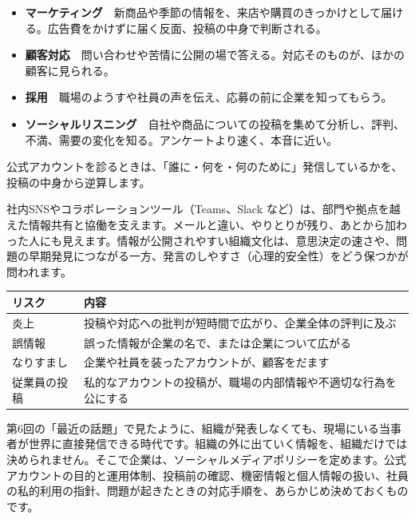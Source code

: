 \documentclass[paper=a4paper,fontsize=10pt,line_length=170mm,number_of_lines=46,baselineskip=1.6zw]{jlreq}
\newcommand\subhead[1]{\par\vspace{2.6mm}{\sffamily\bfseries\large #1}\par\vspace{1.3mm}}
\begin{document}
\begin{itemize}[leftmargin=1.5em,itemsep=0.6mm,topsep=0.3mm]
\item {\sffamily\bfseries マーケティング}　新商品や季節の情報を、来店や購買のきっかけとして届ける。広告費をかけずに届く反面、投稿の中身で判断される。
\item {\sffamily\bfseries 顧客対応}　問い合わせや苦情に公開の場で答える。対応そのものが、ほかの顧客に見られる。
\item {\sffamily\bfseries 採用}　職場のようすや社員の声を伝え、応募の前に企業を知ってもらう。
\item {\sffamily\bfseries ソーシャルリスニング}　自社や商品についての投稿を集めて分析し、評判、不満、需要の変化を知る。アンケートより速く、本音に近い。
\end{itemize}\vspace{0.8mm}
公式アカウントを診るときは、「誰に・何を・何のために」発信しているかを、投稿の中身から逆算します。\par\vspace{1.2mm}
\subhead{組織の中での活用}
社内SNSやコラボレーションツール（Teams、Slack など）は、部門や拠点を越えた情報共有と協働を支えます。メールと違い、やりとりが残り、あとから加わった人にも見えます。情報が公開されやすい組織文化は、意思決定の速さや、問題の早期発見につながる一方、発言のしやすさ（心理的安全性）をどう保つかが問われます。\par\vspace{1.2mm}
\subhead{リスクとガバナンス}
\begin{center}\small\renewcommand{\arraystretch}{1.15}\setlength{\tabcolsep}{1.5mm}
\begin{tabular}{|p{38.0mm}|p{125.0mm}|}\arrayrulecolor{rulec}\hline
\rowcolor{papertwo}\sffamily\bfseries リスク & \sffamily\bfseries 内容\\\hline
炎上 & 投稿や対応への批判が短時間で広がり、企業全体の評判に及ぶ\\\hline
誤情報 & 誤った情報が企業の名で、または企業について広がる\\\hline
なりすまし & 企業や社員を装ったアカウントが、顧客をだます\\\hline
従業員の投稿 & 私的なアカウントの投稿が、職場の内部情報や不適切な行為を公にする\\\hline
\end{tabular}\end{center}\vspace{0.5mm}
第6回の「最近の話題」で見たように、組織が発表しなくても、現場にいる当事者が世界に直接発信できる時代です。組織の外に出ていく情報を、組織だけでは決められません。そこで企業は、ソーシャルメディアポリシーを定めます。公式アカウントの目的と運用体制、投稿前の確認、機密情報と個人情報の扱い、社員の私的利用の指針、問題が起きたときの対応手順を、あらかじめ決めておくものです。\par\vspace{1.2mm}
\end{document}
